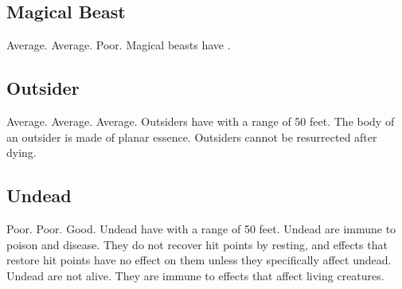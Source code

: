     \subsection{Magical Beast}
         Average.
         Average.
         Poor.
         Magical beasts have .

    \subsection{Outsider}
         Average.
         Average.
         Average.
         Outsiders have  with a range of 50 feet.
         The body of an outsider is made of planar essence.
        Outsiders cannot be resurrected after dying.

    \subsection{Undead}
         Poor.
         Poor.
         Good.
         Undead have  with a range of 50 feet.
         Undead are immune to poison and disease.
        They do not recover hit points by resting, and effects that restore hit points have no effect on them unless they specifically affect undead.
         Undead are not alive.
        They are immune to effects that affect living creatures.
